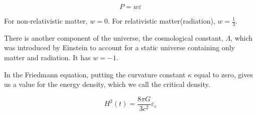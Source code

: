 \documentclass[a4,10pt,twoside]{report}
\begin{document}
	\begin{equation}
		P=w\varepsilon
	\end{equation}
	
	For non-relativistic matter, $w=0$. For relativistic matter(radiation), $w=\frac{1}{3}$.
	
	There is another component of the universe, the cosmological constant, $\Lambda$, which was introduced by Einstein to account for a static universe containing only matter and radiation. It has $w=-1$.
	
	In the Friedmann equation, putting the curvature constant $\kappa$ equal to zero, gives us a value for the energy density, which we call the critical density.
	
	\begin{equation}
	H^2(t)=\frac{8\pi G}{3c^2}\varepsilon_c
	
	\end{equation}
	
\end{document}
